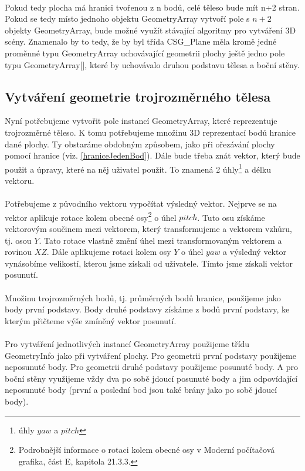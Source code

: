 \documentclass[11pt,twoside,a4paper]{book}
\begin{document}
\paragraph{}
Pokud tedy plocha má hranici tvořenou z n bodů, celé těleso bude mít n+2 stran. Pokud se tedy místo jednoho objektu GeometryArray vytvoří pole s $n+2$ objekty GeometryArray, bude možné využít stávající algoritmy pro vytváření 3D scény. Znamenalo by to tedy, že by byl třída CSG\_Plane měla kromě jedné proměnné typu GeometryArray uchovávající geometrii plochy ještě jedno pole typu GeometryArray[], které by uchovávalo druhou podstavu tělesa a boční stěny.

\subsection{Vytváření geometrie trojrozměrného tělesa}
Nyní potřebujeme vytvořit pole instancí GeometryArray, které reprezentuje trojrozměrné těleso. K tomu potřebujeme množinu 3D reprezentací bodů hranice dané plochy. Ty obstaráme obdobným způsobem, jako při ořezávání plochy pomocí hranice (viz. \ref{hraniceJedenBod}). Dále bude třeba znát vektor, který bude použit a úpravy, které na něj uživatel použit. To znamená 2 úhly\footnote{úhly $yaw$ a $pitch$} a délku vektoru.
\paragraph{}
Potřebujeme z původního vektoru vypočítat výsledný vektor. Nejprve se na vektor aplikuje rotace kolem obecné osy\footnote{Podrobnější informace o rotaci kolem obecné osy v Moderní počítačová grafika\cite{Zara}, část E, kapitola 21.3.3.} o úhel $pitch$. Tuto osu získáme vektorovým součinem mezi vektorem, který transformujeme a vektorem vzhůru, tj. osou $Y$. Tato rotace vlastně změní úhel mezi transformovaným vektorem a rovinou $XZ$.  Dále aplikujeme rotaci kolem osy $Y$ o úhel $yaw$ a výsledný vektor vynásobíme velikostí, kterou jsme získali od uživatele. Tímto jsme získali vektor posunutí.
\paragraph{}
Množinu trojrozměrných bodů, tj. průměrných bodů hranice, použijeme jako body první podstavy. Body druhé podstavy získáme z bodů první podstavy, ke kterým přičteme výše zmíněný vektor posunutí.
\paragraph{}
Pro vytváření jednotlivých instancí GeometryArray použijeme třídu GeometryInfo jako při vytváření plochy. Pro geometrii první podstavy použijeme neposunuté body. Pro geometrii druhé podstavy použijeme posunuté body. A pro boční stěny využijeme vždy dva po sobě jdoucí posunuté body a jim odpovídající neposunuté body (první a poslední bod jsou také brány jako po sobě jdoucí body). 
\end{document}
